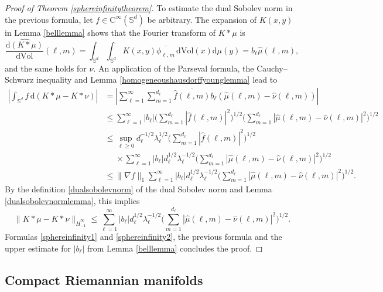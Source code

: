 \documentclass[11pt,a4paper]{article}
\theoremstyle{definition}
\begin{document}
\begin{proof}[Proof of Theorem \ref{sphereinfinitytheorem}]
To estimate the dual Sobolev norm in the previous formula, let $f \in \mathrm{C}^{\infty} (\mathbb{S}^d)$ be arbitrary. The expansion of $K(x,y)$ in Lemma \ref{belllemma} shows that the Fourier transform of $K*\mu$ is
\[ \widehat{\frac{\mathrm{d}(K*\mu)}{\mathrm{d}\mathrm{Vol}}} (\ell, m) = \int_{\mathbb{S}^d} \int_{\mathbb{S}^d} K(x,y) \overline{\phi_{\ell,m}} \, \mathrm{d}\mathrm{Vol}(x) \mathrm{d}\mu (y) = b_{\ell} \widehat{\mu}(\ell,m), \]
and the same holds for $\nu$. An application of the Parseval formula, the Cauchy--Schwarz inequality and Lemma \ref{homogeneoushausdorffyounglemma} lead to
\[ \begin{split} \left| \int_{\mathbb{S}^d} f \, \mathrm{d}(K*\mu - K*\nu) \right| &= \left| \sum_{\ell=1}^{\infty} \sum_{m=1}^{d_{\ell}} \overline{\widehat{f}(\ell,m)} b_{\ell} (\widehat{\mu}(\ell,m) - \widehat{\nu}(\ell,m)) \right| \\ &\le \sum_{\ell=1}^{\infty} |b_{\ell}| \bigg( \sum_{m=1}^{d_{\ell}} |\widehat{f}(\ell,m)|^2 \bigg)^{1/2} \bigg( \sum_{m=1}^{d_{\ell}} |\widehat{\mu}(\ell,m) - \widehat{\nu}(\ell,m)|^2 \bigg)^{1/2} \\ &\le \sup_{\ell \ge 0} d_{\ell}^{-1/2} \lambda_{\ell}^{1/2} \bigg( \sum_{m=1}^{d_{\ell}} |\widehat{f}(\ell,m)|^2 \bigg)^{1/2} \\ &{\phantom{\le}} \times \sum_{\ell=1}^{\infty} |b_{\ell}| d_{\ell}^{1/2} \lambda_{\ell}^{-1/2} \bigg( \sum_{m=1}^{d_{\ell}} |\widehat{\mu}(\ell,m) - \widehat{\nu}(\ell,m)|^2 \bigg)^{1/2} \\ &\le \| \nabla f \|_1 \sum_{\ell=1}^{\infty} |b_{\ell}| d_{\ell}^{1/2} \lambda_{\ell}^{-1/2} \bigg( \sum_{m=1}^{d_{\ell}} |\widehat{\mu}(\ell,m) - \widehat{\nu}(\ell,m)|^2 \bigg)^{1/2} . \end{split} \]
By the definition \eqref{dualsobolevnorm} of the dual Sobolev norm and Lemma \ref{dualsobolevnormlemma}, this implies
\[ \| K*\mu - K*\nu \|_{\dot{H}_{-1}^{\infty}} \le \sum_{\ell=1}^{\infty} |b_{\ell}| d_{\ell}^{1/2} \lambda_{\ell}^{-1/2} \bigg( \sum_{m=1}^{d_{\ell}} |\widehat{\mu}(\ell,m) - \widehat{\nu}(\ell,m)|^2 \bigg)^{1/2} . \]
Formulas \eqref{sphereinfinity1} and \eqref{sphereinfinity2}, the previous formula and the upper estimate for $|b_{\ell}|$ from Lemma \ref{belllemma} concludes the proof.
\end{proof}

\subsection{Compact Riemannian manifolds}
\end{document}
